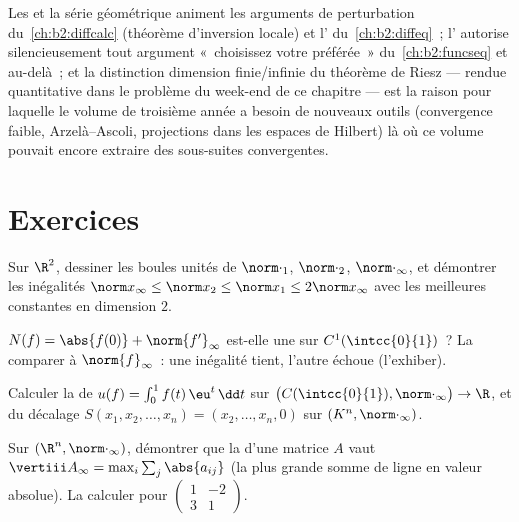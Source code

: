 \begin{remark}
Les  et la série géométrique animent les arguments
de perturbation du~\cref{ch:b2:diffcalc} (théorème d'inversion locale)
et l' du~\cref{ch:b2:diffeq}~; l' autorise silencieusement tout argument «~choisissez votre
 préférée~» du~\cref{ch:b2:funcseq} et au-delà~; et la
distinction dimension finie/infinie du théorème de Riesz --- rendue
quantitative dans le problème du week-end de ce chapitre --- est la
raison pour laquelle le volume de troisième année a besoin de nouveaux
outils (convergence faible, Arzelà--Ascoli, projections dans les
espaces de Hilbert) là où ce volume pouvait encore extraire des
sous-suites convergentes.
\end{remark}

\section{Exercices}

\begin{exercise}[$\star$]\label{exo:b2:nvs:1}
Sur $\R^2$, dessiner les boules unités de $\norm\cdot_1$, $\norm\cdot_2$,
$\norm\cdot_\infty$, et démontrer les inégalités $\norm x_\infty
\leq \norm x_2 \leq \norm x_1 \leq 2\norm x_\infty$ avec les meilleures
constantes en dimension $2$.
\end{exercise}

\begin{exercise}[$\star$]\label{exo:b2:nvs:2}
$N(f) = \abs{f(0)} + \norm{f'}_\infty$ est-elle une  sur
$C^1(\intcc{0}{1})$~? La comparer à $\norm{f}_\infty$~: une
inégalité tient, l'autre échoue (l'exhiber).
\end{exercise}

\begin{exercise}[$\star$]\label{exo:b2:nvs:3}
Calculer la  de $u(f) = \int_0^1 f(t)\,\eu^t\,\dd t$
sur $\bigl(C(\intcc{0}{1}), \norm\cdot_\infty\bigr) \to \R$, et du
décalage $S(x_1, x_2, \dots, x_n) = (x_2, \dots, x_n, 0)$ sur
$(K^n, \norm\cdot_\infty)$.
\end{exercise}

\begin{exercise}[$\star\star$]\label{exo:b2:nvs:4}
Sur $(\R^n, \norm\cdot_\infty)$, démontrer que la 
d'une matrice $A$ vaut $\vertiii A_\infty = \max_i \sum_j \abs{a_{ij}}$
(la plus grande somme de ligne en valeur absolue). La calculer pour
$\begin{pmatrix} 1 & -2\\ 3 & 1\end{pmatrix}$.
\end{exercise}

